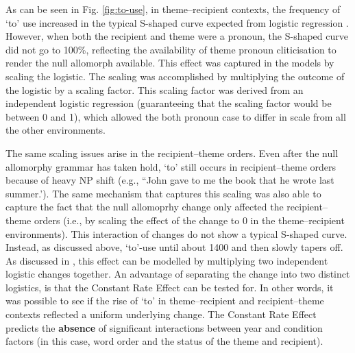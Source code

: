 	As can be seen in Fig. \ref{fig:to-use}, in theme--recipient contexts, the frequency of `to' use increased in the typical S-shaped curve expected from logistic regression \citep{Kroch.1989}. However, when both the recipient and theme were a pronoun, the S-shaped curve did not go to 100\%, reflecting the availability of theme pronoun cliticisation to render the null allomorph available. This effect was captured in the models by scaling the logistic. The scaling was accomplished by multiplying the outcome of the logistic by a scaling factor. This scaling factor was derived from an independent logistic regression (guaranteeing that the scaling factor would be between 0 and 1), which allowed the both pronoun case to differ in scale from all the other environments.

	The same scaling issues arise in the recipient--theme orders. Even after the null allomorphy grammar has taken hold, `to' still occurs in recipient--theme orders because of heavy NP shift (e.g., ``John gave to me the book that he wrote last summer.'). The same mechanism that captures this scaling was also able to capture the fact that the null allomoprhy change only affected the recipient--theme orders (i.e., by scaling the effect of the change to 0 in the theme--recipient environments). This interaction of changes do not show a typical S-shaped curve. Instead, as discussed above, `to'-use until about 1400 and then slowly tapers off. As discussed in \cite{Bacovcin.2016}, this effect can be modelled by multiplying two independent logistic changes together. An advantage of separating the change into two distinct logistics, is that the Constant Rate Effect can be tested for. In other words, it was possible to see if the rise of `to' in theme--recipient and recipient--theme contexts reflected a uniform underlying change. The Constant Rate Effect predicts the \textbf{absence} of significant interactions between year and condition factors (in this case, word order and the status of the theme and recipient). 

